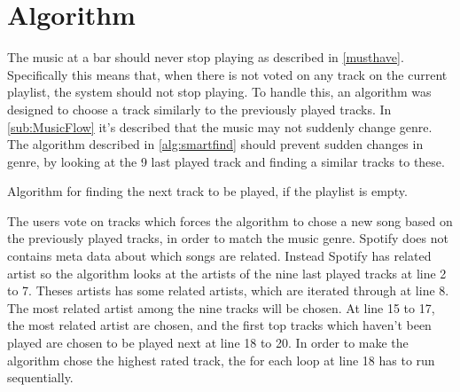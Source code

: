 \section{Algorithm}
\label{sec:algorithm}

The music at a bar should never stop playing as described in
\cref{musthave}. Specifically this means that, when there is not voted
on any track on the current playlist, the system should not stop
playing. To handle this, an algorithm was designed to choose a track
similarly to the previously played tracks. In \cref{sub:MusicFlow}
it's described that the music may not suddenly change genre. The
algorithm described in \cref{alg:smartfind} should prevent sudden
changes in genre, by looking at the 9 last played track and finding a
similar tracks to these.


\begin{algorithm}[hbtp]
\caption{Algorithm for finding the next track to be played, if the playlist is empty.}\label{alg:smartfind}
\begin{algorithmic}[1]
	 
		\EndIf{}
					\Else{}
					\EndIf{}
				\EndFor{}
			\EndFor{}
		\EndFor{}
			\EndIf{}
		\EndFor{}
			\State{}
			\EndIf{}
		\EndFor{}
	\EndFunction{}
\end{algorithmic}
\end{algorithm}

The users vote on tracks which forces the algorithm to chose a new song based on the previously played tracks, in order to match the music genre. Spotify does not contains meta data about which songs are related. Instead Spotify has related artist so the algorithm looks at the artists of the nine last played tracks at line 2 to 7. Theses artists has some related artists, which are iterated through at line 8. The most related artist among the nine tracks will be chosen. At line 15 to 17, the most related artist are chosen, and the first top tracks which haven't been played are chosen to be played next at line 18 to 20. In order to make the algorithm chose the highest rated track, the for each loop at line 18 has to run sequentially.
